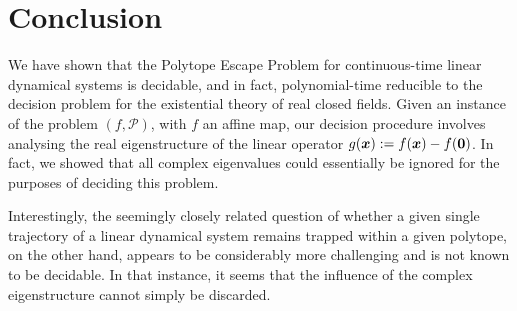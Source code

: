 \section{Conclusion}

We have shown that the Polytope Escape Problem for continuous-time
linear dynamical systems is decidable, and in fact, polynomial-time
reducible to the decision problem for the existential theory of real
closed fields.  Given an instance of the problem $(f,\mathcal{P})$,
with $f$ an affine map, our decision procedure involves analysing the real
eigenstructure of the linear operator
$g(\boldsymbol{x}):=f(\boldsymbol{x})-f(\boldsymbol{0})$. In fact, we
showed that all complex eigenvalues could essentially be ignored for
the purposes of deciding this problem.

Interestingly, the seemingly closely related question of whether a
given single trajectory of a linear dynamical system remains trapped
within a given polytope, on the other hand, appears to be
considerably more challenging and is not known to be decidable. In
that instance, it seems that the influence of the complex
eigenstructure cannot simply be discarded.
